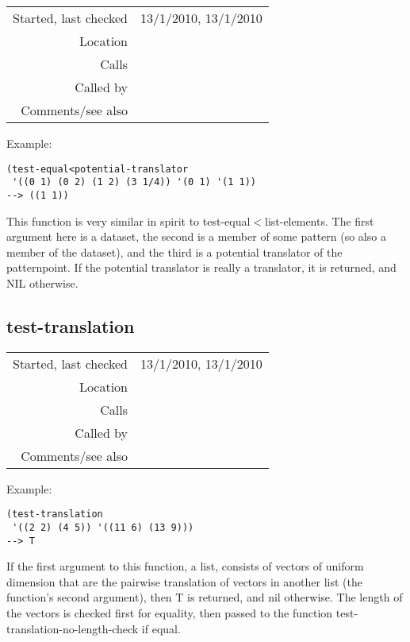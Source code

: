 \vspace{0.3cm}
\begin{tabular}{r|p{8cm}}
Started, last checked & 13/1/2010, 13/1/2010 \\
Location & \nameref{sec:set-operations} \\
Calls & \nameref{fun:add-two-lists} \\
Called by & \nameref{fun:check-potential-translators} \\
Comments/see also & \nameref{fun:test-equal<potential-translator-mod-2nd-n}
\end{tabular}

\vspace{0.5cm}
\noindent Example:
\begin{verbatim}
(test-equal<potential-translator
 '((0 1) (0 2) (1 2) (3 1/4)) '(0 1) '(1 1))
--> ((1 1))
\end{verbatim}

\noindent This function is very similar in spirit to
test-equal$<$list-elements. The first argument here is a
dataset, the second is a member of some pattern (so
also a member of the dataset), and the third is a
potential translator of the patternpoint. If the
potential translator is really a translator, it is
returned, and NIL otherwise.


\subsection*{test-translation}\label{fun:test-translation}

\vspace{0.3cm}
\begin{tabular}{r|p{8cm}}
Started, last checked & 13/1/2010, 13/1/2010 \\
Location & \nameref{sec:set-operations} \\
Calls & \nameref{fun:test-translation-no-length-check} \\
Called by & \nameref{fun:check-potential-translators} \\
Comments/see also & \nameref{fun:test-translation-mod-2nd-n}
\end{tabular}

\vspace{0.5cm}
\noindent Example:
\begin{verbatim}
(test-translation
 '((2 2) (4 5)) '((11 6) (13 9)))
--> T
\end{verbatim}

\noindent If the first argument to this function, a
list, consists of vectors of uniform dimension that
are the pairwise translation of vectors in another
list (the function's second argument), then T is
returned, and nil otherwise. The length of the vectors
is checked first for equality, then passed to the
function test-translation-no-length-check if equal.


